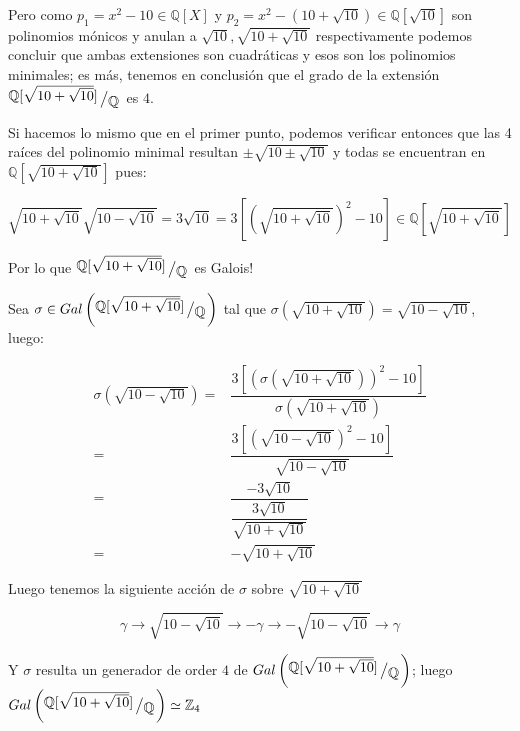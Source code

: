 \documentclass[11pt]{article}
\newcommand{\Q}{\mathbb{Q}}
\newcommand{\Z}{\mathbb{Z}}
\newcommand{\quotient}[2]{{\raisebox{.2em}{$#1$}\left/\raisebox{-.2em}{$#2$}\right.}}
\numberwithin{theorem}{subsection}
\begin{document}
\begin{enumerate}
\begin{itemize}
		Pero como $p_1 = x^2 - 10 \in \Q[X]$ y $p_2 = x^2 - \left(10 + \sqrt{10}\right) \in \Q[\sqrt{10}]$ son polinomios m\'onicos y anulan a $\sqrt{10}, \sqrt{10+\sqrt{10}}$ respectivamente podemos concluir que ambas extensiones son cuadr\'aticas y esos son los polinomios minimales; es m\'as, tenemos en conclusi\'on que el grado de la extensi\'on $\quotient{\Q[\sqrt{10 + \sqrt{10}}]}{\Q}$ es $4$.
		
		Si hacemos lo mismo que en el primer punto, podemos verificar entonces que las 4 ra\'ices del polinomio minimal resultan $\pm \sqrt{10 \pm \sqrt{10}}$ y todas se encuentran en $\Q[\sqrt{10 + \sqrt{10}}]$ pues:
		
		\begin{equation*}
		\sqrt{10 + \sqrt{10}} \sqrt{10 - \sqrt{10}} = 3 \sqrt{10} = 3 \left[\left(\sqrt{10 + \sqrt{10}}\right)^2 -10 \right] \in \Q[\sqrt{10 + \sqrt{10}}]
		\end{equation*}
		
		Por lo que $\quotient{\Q[\sqrt{10 + \sqrt{10}}]}{\Q}$ es Galois!
		
		Sea $\sigma \in Gal\left(\quotient{\Q[\sqrt{10 + \sqrt{10}}]}{\Q}\right)$ tal que $\sigma(\sqrt{10 + \sqrt{10}}) = \sqrt{10 - \sqrt{10}}$, luego:
		
		\begin{equation*}
			\begin{aligned}
				\sigma\left(\sqrt{10 - \sqrt{10}}\right) = & \dfrac{3 \left[\left(\sigma(\sqrt{10 + \sqrt{10}})\right)^2 -10 \right] }{\sigma(\sqrt{10+\sqrt{10}})} \\
				= &  \dfrac{3 \left[\left(\sqrt{10 - \sqrt{10}}\right)^2 -10 \right] }{\sqrt{10-\sqrt{10}}} \\
				= &  \dfrac{-3 \sqrt{10}}{\dfrac{3\sqrt{10}}{\sqrt{10 + \sqrt{10}}}} \\
				= & -\sqrt{10 + \sqrt{10}}
			\end{aligned}
		\end{equation*}
		
		Luego tenemos la siguiente acci\'on de $\sigma$ sobre $\sqrt{10+\sqrt{10}}$
		
		\begin{equation*}
			\gamma \rightarrow \sqrt{10 - \sqrt{10}} \rightarrow - \gamma \rightarrow - \sqrt{10 - \sqrt{10}} \rightarrow \gamma
		\end{equation*}
		
		Y $\sigma$ resulta un generador de order $4$ de $Gal\left(\quotient{\Q[\sqrt{10 + \sqrt{10}}]}{\Q}\right)$; luego $Gal\left(\quotient{\Q[\sqrt{10 + \sqrt{10}}]}{\Q}\right) \simeq \Z_4$
		

\end{itemize}
\end{enumerate}
\end{document}
